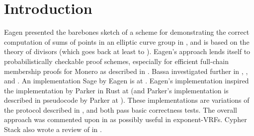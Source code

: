 \documentclass{article}
\theoremstyle{definition}
\newcommand{\6}{\mathbf}
\newcommand{\7}{\mathcal}
\begin{document}







    


\section{Introduction}

Eagen presented the barebones sketch of a scheme for demonstrating the correct computation of sums of points in an elliptic curve group in \cite{Eagen22}, and is based on the theory of divisors (which goes back at least to \cite{dedekind1882theorie}). 
Eagen's approach lends itself to probabilistically checkable proof schemes, especially for efficient full-chain membership proofs for Monero as described in \cite{Kayaba24}. Bassa investigated further in \cite{BassaSoundnessProofSoP}, \cite{BassaLogDerivSoP}, and \cite{BassaSoundnessIPDL}. An implementation Sage by Eagen is at \cite{EagenSage24}. Eagen's implementation inspired the implementation by Parker in Rust at \cite{Kayaba24} (and Parker's implementation is described in pseudocode by Parker at \cite{KayabaG24}). These implementations are variations of the protocol described in \cite{BassaSoundnessIPDL}, and both pass basic correctness tests. The overall approach was commented upon in \cite{boneh2025exponent} as possibly useful in exponent-VRFs. Cypher Stack also wrote a review of \cite{BassaSoundnessProofSoP} in \cite{VeridiseLogReview}.
\end{document}
